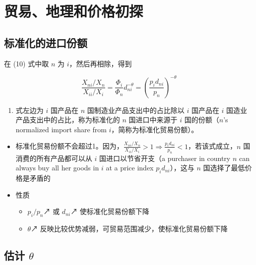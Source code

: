 \documentclass[
]{article}
\providecommand{\tightlist}{%
  \setlength{\itemsep}{0pt}\setlength{\parskip}{0pt}}
\begin{document}
\hypertarget{estimate-partial-equilibrium}{%
\section{贸易、地理和价格初探}\label{estimate-partial-equilibrium}}

\hypertarget{ux6807ux51c6ux5316ux7684ux8fdbux53e3ux4efdux989d}{%
\subsection{标准化的进口份额}\label{ux6807ux51c6ux5316ux7684ux8fdbux53e3ux4efdux989d}}

在 (10) 式中取 \(n\) 为 \(i\)，然后再相除，得到

\[
\frac{X_{n i} / X_{n}}{X_{i i} / X_{i}}=\frac{\Phi_{i}}{\Phi_{n}} d_{n i}^{-\theta}=\left(\frac{p_{i} d_{n i}}{p_{n}}\right)^{-\theta} \tag{12}
\]

\begin{enumerate}
\def\labelenumi{(\arabic{enumi})}
\setcounter{enumi}{11}
\tightlist
\item
  式左边为 \(i\) 国产品在 \(n\) 国制造业产品支出中的占比除以 \(i\) 国产品在 \(i\)
  国造业产品支出中的占比，称为标准化的 \(n\) 国进口中来源于 \(i\) 国的份额（\(n\)'s normalized
  import share from \(i\)，简称为标准化贸易份额）。
\end{enumerate}

\begin{itemize}
\tightlist
\item
  标准化贸易份额不会超过1。因为，\(\frac{X_{n i} / X_{n}}{X_{i i} / X_{i}}>1 \Rightarrow \frac{p_{i} d_{n i}}{p_{n}}<1\)，若该式成立，\(n\)
  国消费的所有产品都可以从 \(i\) 国进口以节省开支（a purchaser in country \(n\)
  can always buy all her goods in \(i\) at a price index \(p_{i} d_{n i}\)），这与
  \(n\) 国选择了最低价格是矛盾的
\item
  性质

  \begin{itemize}
  \tightlist
  \item
    \(p_i/p_n\)↗ 或 \(d_{ni}\)↗ 使标准化贸易份额下降
  \item
    \(\theta\)↗ 反映比较优势减弱，可贸易范围减少，使标准化贸易份额下降
  \end{itemize}
\end{itemize}

\hypertarget{trade-price-estimate}{%
\subsection{\texorpdfstring{估计 \(\theta\)}{估计 \textbackslash theta}}\label{trade-price-estimate}}
\end{document}
